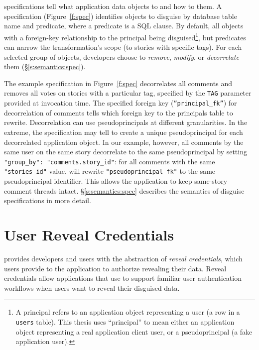 \Xx specifications tell \sys what application data objects to \xx and how to \xx
them.
%
A \xx specification (Figure~\ref{f:spec}) identifies objects to disguise by
database table name and predicate, where a predicate is a SQL  clause.
%
By default, \sys \xxs all objects with a foreign-key relationship to 
the principal being disguised\footnote{A
principal refers to an application object representing a user (\eg a row in a
\texttt{users} table). This thesis uses ``principal'' to mean either an 
application object representing a real application client user, or a
pseudoprincipal (a fake application user).},
but predicates
can narrow the transformation's scope (\eg to stories with specific tags).
%
For each selected group of objects, developers choose to \emph{remove},
\emph{modify}, or \emph{decorrelate} them (\S\ref{s:semantics:spec}).
%

The example specification in Figure~\ref{f:spec} decorrelates all comments and
removes all votes on stories with a particular tag, specified by the
\texttt{TAG} parameter provided at invocation time.  The specified foreign key
(\texttt{''principal\_fk''}) for decorrelation of comments tells \sys which
foreign key to the principals table to rewrite. 
%
Decorrelation can use pseudoprincipals at different granularities.  In the
extreme, the \xx specification may tell \sys to create a unique pseudoprincipal
for each decorrelated application object.  In our example, however, all comments
by the same user on the same story decorrelate to the same pseudoprincipal by
setting \verb+"group_by": "comments.story_id"+: for all comments with the same
\texttt{"stories\_id"} value, \sys will rewrite \texttt{"pseudoprincipal\_fk"}
to the same pseudoprincipal identifier.  This allows the application to keep
same-story comment threads intact.
%
\S\ref{s:semantics:spec} describes the semantics of disguise specifications in more
detail.
%
%

\section{User Reveal Credentials}
\sys provides developers and users with the abstraction of \emph{reveal
credentials}, which users provide to the application to authorize revealing
their data.
%
Reveal credentials allow applications that use \sys to support familiar user
authentication workflows when users want to reveal their disguised data. 
%

